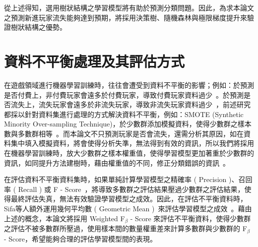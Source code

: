 從上述得知，選用樹狀結構之學習模型將有助於預測分類問題。因此，為求本論文之預測新進玩家流失能夠達到預期，將採用決策樹、隨機森林與極限梯度提升來驗證樹狀結構之優勢。
\newpage

\section{資料不平衡處理及其評估方式}

在遊戲領域進行機器學習訓練時，往往會遭受到資料不平衡的影響；例如：於預測是否付費上，非付費玩家會遠多於付費玩家，導致付費玩家資料過少~\cite{sifa2015predicting}。於預測是否流失上，流失玩家會遠多於非流失玩家，導致非流失玩家資料過少~\cite{lee2016predicting}，前述研究都採以針對資料集進行處理的方式解決資料不平衡，例如：SMOTE (Synthetic Minority Over-sampling Technique)，於少數群添加模擬資料，使得少數群之樣本數與多數群相等~\cite{chawla2002smote}。而本論文不只預測玩家是否會流失，還需分析其原因，如在資料集中填入模擬資料，將會使得分析失準，無法得到有效的資訊，所以我們將採用在機器學習訓練時，放大少數群之樣本權重值，使得學習模型更加著重於少數群的資訊，如同提升方法建樹時，藉由權重值的不同，修正分類錯誤的資訊~\cite{freund1999short}。

在評估資料不平衡資料集時，如果單純計算學習模型之精確率 ( Precision )、召回率 ( Recall ) 或 F - Score~\cite{chinchor1993muc}，將導致多數群之評估結果壓過少數群之評估結果，使得最終評估失真，無法有效驗證學習模型之成效。因此，在評估不平衡資料時，Sifa等人額外運用幾何平均數 ( Geometric Mean )~\cite{kubat1997learning}來評估學習模型之成效~\cite{sifa2015predicting}。藉由上述的概念，本論文將採用 Weighted F$_{\beta}$ - Score 來評估不平衡資料，使得少數群之評估不被多數群所壓過，使用樣本間的數量權重差來計算多數群與少數群的 F$_{\beta}$ - Score，希望能夠合理的評估學習模型間的表現。